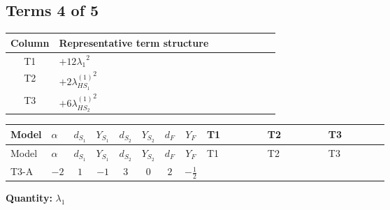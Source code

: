 \documentclass[8pt]{article}
\begin{document}
\begin{landscape}
\subsection*{Terms 4 of 5}
\begin{center}
\begin{tabular}{@{}c >{\raggedright\arraybackslash}p{0.82\linewidth}@{}}
\toprule
Column & Representative term structure \\
\midrule
T1 & \(\displaystyle +12 {\lambda_1}^2\) \\
\midrule
T2 & \(\displaystyle +2 {\lambda_{HS_1}^{(1)}}^2\) \\
\midrule
T3 & \(\displaystyle +6 {\lambda_{HS_2}^{(1)}}^2\) \\
\midrule
\bottomrule
\end{tabular}
\end{center}
\smallskip
\tiny
\begin{longtable}{@{}llcccccc >{\raggedright\arraybackslash}p{0.21\linewidth} >{\raggedright\arraybackslash}p{0.21\linewidth} >{\raggedright\arraybackslash}p{0.21\linewidth}@{}}
\toprule
Model & $\alpha$ & $d_{S_1}$ & $Y_{S_1}$ & $d_{S_2}$ & $Y_{S_2}$ & $d_F$ & $Y_F$ & T1 & T2 & T3 \\
\midrule
\endfirsthead
\toprule
Model & $\alpha$ & $d_{S_1}$ & $Y_{S_1}$ & $d_{S_2}$ & $Y_{S_2}$ & $d_F$ & $Y_F$ & T1 & T2 & T3 \\
\midrule
\endhead
T3-A & $-2$ & $1$ & $-1$ & $3$ & $0$ & $2$ & $-\frac{1}{2}$ & \scriptsize\adjustbox{max width=\linewidth}{$\begin{gathered} +12 {\lambda_1}^2\end{gathered}$} & \scriptsize\adjustbox{max width=\linewidth}{$\begin{gathered} +2 {\lambda_{HS_1}^{(1)}}^2\end{gathered}$} & \scriptsize\adjustbox{max width=\linewidth}{$\begin{gathered} +6 {\lambda_{HS_2}^{(1)}}^2\end{gathered}$} \\
\midrule
\bottomrule
\end{longtable}
\clearpage
\noindent\textbf{Quantity: }$\lambda_1$\par\smallskip

\end{landscape}
\end{document}
